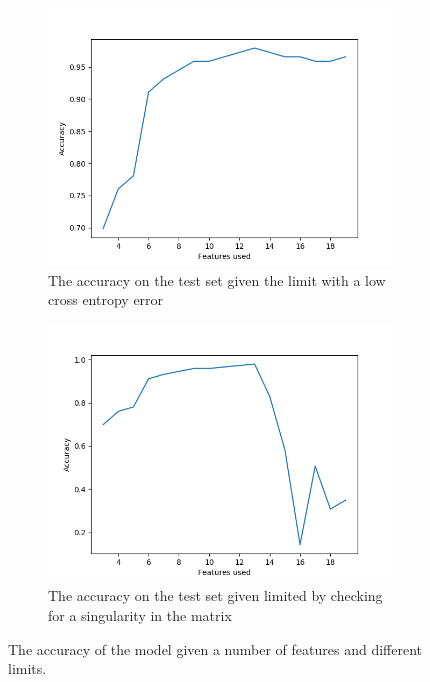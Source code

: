 \documentclass[a4paper,11pt]{article}
\begin{document}
\begin{figure}
	\centering
	\begin{subfigure}[b]{0.49\textwidth}
		\centering
		\includegraphics[width=\textwidth]{images/irls_acc.png}
		\caption{The accuracy on the test set given the limit with a low cross entropy error}
		\label{irls:acc_lim}
	\end{subfigure}
	\begin{subfigure}[b]{0.49\textwidth}
		\centering
		\includegraphics[width=\textwidth]{images/irls_acc2.png}
		\caption{The accuracy on the test set given limited by checking for a singularity in the matrix}
		\label{irls:acc_nolim}
	\end{subfigure}
	\caption{The accuracy of the model given a number of features and different limits.}
	\label{irls:acc}
\end{figure} 
\end{document}
